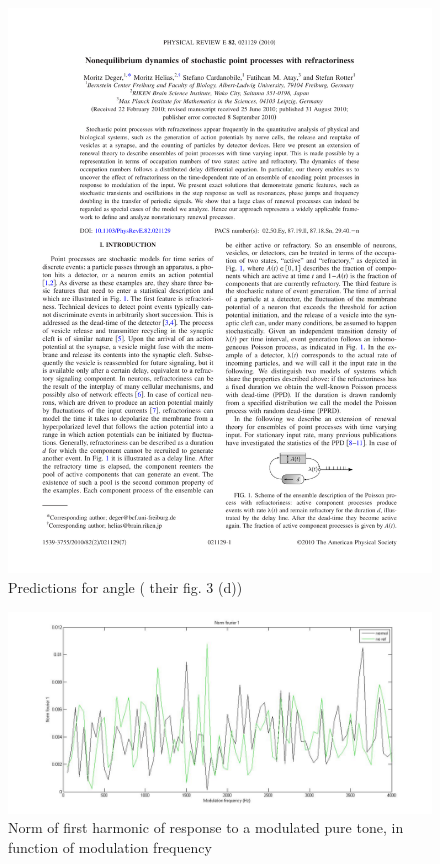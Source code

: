 \begin{figure}[h]
	\centering
	\includegraphics*[page=4,viewport=433 567 566 619]{images/Deger2010.pdf} %
	\caption{Predictions for angle (\cite{Deger} their fig. 3 (d))}
	\label{fig:predangle}
\end{figure}

\begin{figure}[ht]
	\centering
  \includegraphics[width=\textwidth]{images/norm1.jpg}
	\caption{Norm of first harmonic of response to a modulated pure tone, in function of modulation frequency}
	\label{fig:norm1}
\end{figure}

